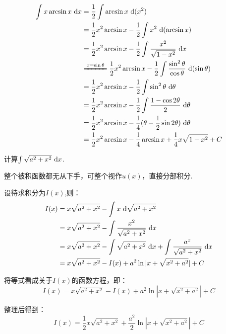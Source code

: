 \begin{solution}
\begin{equation}
    \begin{aligned}
        \int x \arcsin x ~\d x
        &= \frac{1}{2} \int \arcsin x ~\d(x^2) \\
        &= \frac{1}{2} x^2 \arcsin x - \frac{1}{2} \int x^2 ~\d (\arcsin x) \\
        &= \frac{1}{2} x^2 \arcsin x - \frac{1}{2} \int \frac{x^2}{\sqrt{1-x^2}} ~\d x \\
        &\xlongequal{x=\sin \theta} \frac{1}{2} x^2 \arcsin x -\frac{1}{2} \int \frac{\sin^2 \theta}{\cos \theta} ~\d (\sin \theta) \\
        &= \frac{1}{2} x^2 \arcsin x-\frac{1}{2} \int \sin^2 \theta ~\d \theta \\
        &= \frac{1}{2} x^2 \arcsin x-\frac{1}{2} \int \frac{1 - \cos 2\theta}{2} ~\d \theta \\
        &= \frac{1}{2} x^2 \arcsin x-\frac{1}{4}(\theta - \frac{1}{2}\sin 2\theta) ~\d \theta \\
        &= \frac{1}{2} x^2 \arcsin x-\frac{1}{4}\arcsin x +\frac{1}{4}x\sqrt{1-x^2} + C
        \nonumber
    \end{aligned}
\end{equation}
\end{solution}

\begin{example}
\label{ex:ch03-29}
计算$\int \sqrt{a^2 + x^2} ~\mathrm{d} x$.
\end{example}

\begin{analysis}
整个被积函数都无从下手，可整个视作$u(x)$，直接分部积分.
\end{analysis}

\begin{solution}
设待求积分为$I(x)$,则：
\begin{equation}
    \begin{aligned}
        I(x)
        &= x\sqrt{a^2 + x^2} -\int x ~\mathrm{d} \sqrt{a^2 + x^2} \\
        &= x\sqrt{a^2 + x^2} -\int \frac{x^2}{\sqrt{a^2 + x^2}} ~\mathrm{d} x \\
        &= x\sqrt{a^2 + x^2} -\int \sqrt{a^2 + x^2} ~\mathrm{d} x + \int \frac{a^x}{\sqrt{a^2 + x^2}} ~\mathrm{d} x \\
        &= x\sqrt{a^2 + x^2} -I(x) +a^2 \ln |x+\sqrt{x^2+a^2}| + C
        \nonumber
    \end{aligned}
\end{equation} \par
将等式看成关于$I(x)$的函数方程，即：
$$
I(x) = x\sqrt{a^2 + x^2} -I(x) +a^2 \ln |x+\sqrt{x^2+a^2}| + C
$$

整理后得到：
$$
I(x) = \frac{1}{2}x\sqrt{a^2 + x^2} + \frac{a^2}{2} \ln |x+\sqrt{x^2+a^2}| + C
$$
\end{solution}


